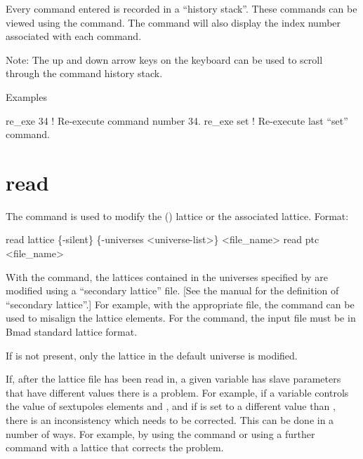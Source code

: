 \vskip 10pt 

Every \tao command entered is recorded in a ``history stack''. These commands can be viewed using
the  command. The  command will also display the index number
associated with each command.

Note: The up and down arrow keys on the keyboard can be used to scroll through the command history
stack.

Examples
\begin{example}
  re_exe 34   ! Re-execute command number 34.
  re_exe set  ! Re-execute last ``set'' command.  
\end{example}

\section{read}
\label{s:read}

The  command is used to modify the (\bmad)  lattice or the associated 
lattice. Format:
\begin{example}
  read lattice \{-silent\} \{-universes <universe-list>\} <file_name>
  read ptc <file_name>
\end{example}

\vskip 10pt 

With the  command, the  lattices contained in the universes specified by
 are modified using a ``secondary lattice'' file.  [See the \bmad manual for the
definition of ``secondary lattice''.] For example, with the appropriate file, the  command
can be used to misalign the lattice elements. For the  command, the input file must
be in Bmad standard lattice format.

If  is not present, only the  lattice
in the default universe is modified.

If, after the lattice file has been read in, a given \tao variable has slave parameters that have
different values there is a problem. For example, if a \tao variable controls the  value of
sextupoles elements  and , and if  is set to a different value than ,
there is an inconsistency which needs to be corrected. This can be done in a number of ways. For
example, by using the  command or using a further  command with
a lattice that corrects the problem.

